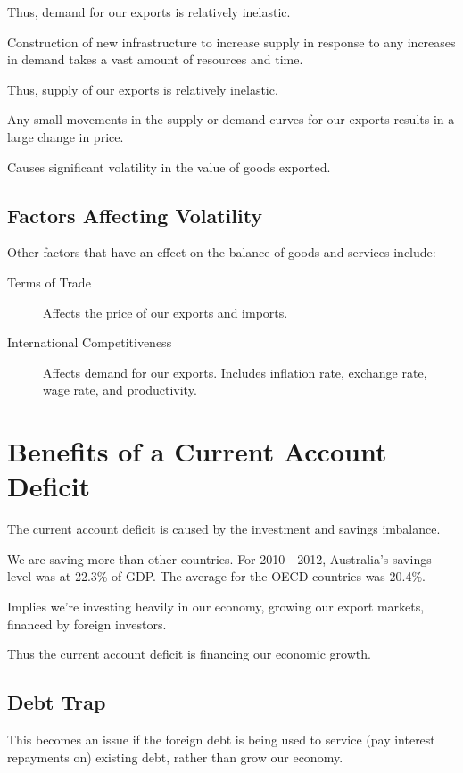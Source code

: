 \documentclass[a4paper,11pt]{report}
\begin{document}
Thus, demand for our exports is relatively inelastic.

Construction of new infrastructure to increase supply in response to any
increases in demand takes a vast amount of resources and time.

Thus, supply of our exports is relatively inelastic.

Any small movements in the supply or demand curves for our exports results in
a large change in price.

Causes significant volatility in the value of goods exported.

\subsection{Factors Affecting Volatility}

Other factors that have an effect on the balance of goods and services include:

\begin{description}
\item [Terms of Trade] Affects the price of our exports and imports.
\item [International Competitiveness] Affects demand for our exports. Includes
	inflation rate, exchange rate, wage rate, and productivity.
\end{description}


\section{Benefits of a Current Account Deficit}

The current account deficit is caused by the investment and savings imbalance.

We are saving more than other countries. For 2010 - 2012, Australia's savings
level was at 22.3\% of GDP. The average for the OECD countries was 20.4\%.

Implies we're investing heavily in our economy, growing our export markets,
financed by foreign investors.

Thus the current account deficit is financing our economic growth.

\subsection{Debt Trap}

This becomes an issue if the foreign debt is being used to service (pay
interest repayments on) existing debt, rather than grow our economy.
\end{document}
